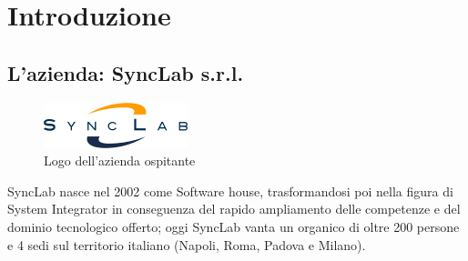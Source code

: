 
\chapter{Introduzione}
\label{cap:introduzione}






\section{L'azienda: SyncLab s.r.l.}


\begin{figure}[!h] 
	\centering 
	\includegraphics[width=0.25\columnwidth]{immagini/logo_azienda} 
	\caption{Logo dell'azienda ospitante}
	\label{figura:logo-azienda}
\end{figure}
SyncLab nasce nel 2002 come Software house, trasformandosi poi nella figura di \gls{System Integrator} in conseguenza del rapido ampliamento delle competenze e del dominio tecnologico offerto; oggi SyncLab vanta un organico di oltre 200 persone e 4 sedi sul territorio italiano (Napoli, Roma, Padova e Milano).\\


